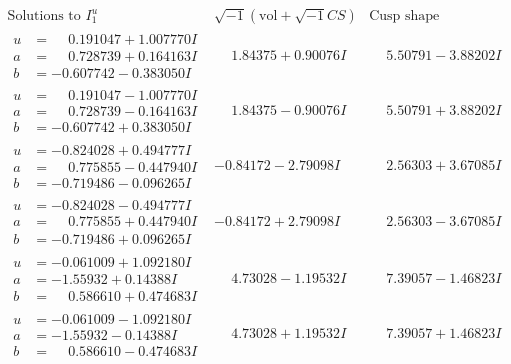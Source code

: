 \documentclass[1p]{elsarticle_modified}
\theoremstyle{definition}
\newcommand{\I}{\sqrt{-1}}
\begin{document}
$$\begin{array}{c|c|c}  
\text{Solutions to }I^u_{1}& \I (\text{vol} + \sqrt{-1}CS) & \text{Cusp shape}\\
 \hline 
\begin{aligned}
u &= \phantom{-}0.191047 + 1.007770 I \\
a &= \phantom{-}0.728739 + 0.164163 I \\
b &= -0.607742 - 0.383050 I\end{aligned}
 & \phantom{-}1.84375 + 0.90076 I & \phantom{-}5.50791 - 3.88202 I \\ \hline\begin{aligned}
u &= \phantom{-}0.191047 - 1.007770 I \\
a &= \phantom{-}0.728739 - 0.164163 I \\
b &= -0.607742 + 0.383050 I\end{aligned}
 & \phantom{-}1.84375 - 0.90076 I & \phantom{-}5.50791 + 3.88202 I \\ \hline\begin{aligned}
u &= -0.824028 + 0.494777 I \\
a &= \phantom{-}0.775855 - 0.447940 I \\
b &= -0.719486 - 0.096265 I\end{aligned}
 & -0.84172 - 2.79098 I & \phantom{-}2.56303 + 3.67085 I \\ \hline\begin{aligned}
u &= -0.824028 - 0.494777 I \\
a &= \phantom{-}0.775855 + 0.447940 I \\
b &= -0.719486 + 0.096265 I\end{aligned}
 & -0.84172 + 2.79098 I & \phantom{-}2.56303 - 3.67085 I \\ \hline\begin{aligned}
u &= -0.061009 + 1.092180 I \\
a &= -1.55932 + 0.14388 I \\
b &= \phantom{-}0.586610 + 0.474683 I\end{aligned}
 & \phantom{-}4.73028 - 1.19532 I & \phantom{-}7.39057 - 1.46823 I \\ \hline\begin{aligned}
u &= -0.061009 - 1.092180 I \\
a &= -1.55932 - 0.14388 I \\
b &= \phantom{-}0.586610 - 0.474683 I\end{aligned}
 & \phantom{-}4.73028 + 1.19532 I & \phantom{-}7.39057 + 1.46823 I \\ \hline\begin{aligned}

\end{aligned}
\end{array}$$
\end{document}
